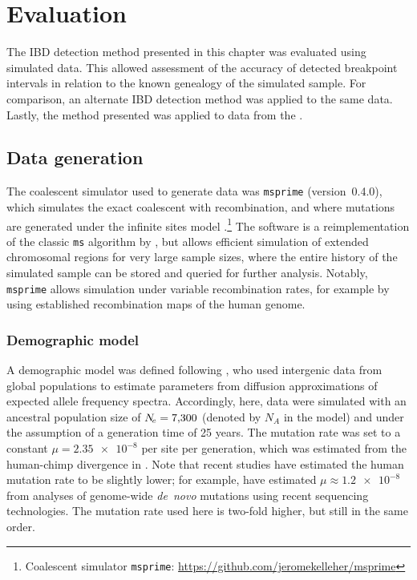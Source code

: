 %
\section{Evaluation}
%

The IBD detection method presented in this chapter was evaluated using simulated data.
This allowed assessment of the accuracy of detected breakpoint intervals in relation to the known genealogy of the simulated sample.
For comparison, an alternate IBD detection method was applied to the same data.
Lastly, the method presented was applied to data from the .



%
\subsection{Data generation}
\label{sec:msprime}
%

The coalescent simulator used to generate data was \texttt{msprime} (version~{0.4.0}), which simulates the exact coalescent with recombination, and where mutations are generated under the infinite sites model \citep{Kelleher:2016fn}.\footnote{Coalescent simulator \texttt{msprime}: \url{https://github.com/jeromekelleher/msprime} }
The software is a reimplementation of the classic \texttt{ms} algorithm by \citet{Hudson:2002vy}, but allows efficient simulation of extended chromosomal regions for very large sample sizes, where the entire history of the simulated sample can be stored and queried for further analysis.
Notably, \texttt{msprime} allows simulation under variable recombination rates, for example by using established recombination maps of the human genome.


%
\subsubsection{Demographic model}
\label{sec:sim_demo_model}
%

A demographic model was defined following \citet{Gutenkunst:2009gs}, who used intergenic data from  global populations to estimate parameters from diffusion approximations of expected allele frequency spectra.
Accordingly, here, data were simulated with an ancestral population size of ${N_{\!e} = \num{7300}}$ (denoted by $N_A$ in the model) and under the assumption of a generation time of 25 years.
The mutation rate was set to a constant ${\mu = \num[round-precision=2]{2.35e-8}}$ per site per generation, which was estimated from the human-chimp divergence in \citet{Gutenkunst:2009gs}.
Note that recent studies have estimated the human mutation rate to be slightly lower; for example, \citet{Scally:2012fe} have estimated ${\mu \approx \num[round-precision=1]{1.2e-8}}$ from analyses of genome-wide \emph{de~novo} mutations using recent sequencing technologies.
The mutation rate used here is two-fold higher, but still in the same order.

